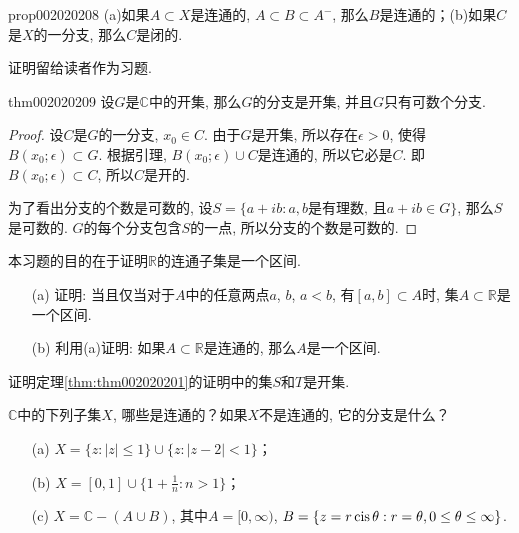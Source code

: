 \begin{proposition}{}{prop002020208}
(a)如果$A \subset X$是连通的, $A \subset B \subset A^-$, 那么$B$是连通的；(b)如果$C$是$X$的一分支, 那么$C$是闭的. 
\end{proposition}

证明留给读者作为习题. 

\begin{theorem}{}{thm002020209}
设$G$是$\mathbb{C}$中的开集, 那么$G$的分支是开集, 并且$G$只有可数个分支.  
\end{theorem}

\begin{proof}
设$C$是$G$的一分支, $x_0 \in C$. 由于$G$是开集, 所以存在$\epsilon > 0$, 使得$B(x_0;\epsilon) \subset G$. 根据引理, $B(x_0;\epsilon) \cup C$是连通的, 所以它必是$C$. 即$B(x_0;\epsilon) \subset C$, 所以$C$是开的. 

为了看出分支的个数是可数的, 设$S = \{a + ib: a, b\text{是有理数, 且}a+ib \in G\}$, 那么$S$是可数的. $G$的每个分支包含$S$的一点, 所以分支的个数是可数的. 
\end{proof}

\begin{exercise}\label{exer002020201}
本习题的目的在于证明$\mathbb{R}$的连通子集是一个区间. 
\begin{enumerate}
\item[(a)]证明: 当且仅当对于$A$中的任意两点$a$, $b$, $a < b$, 有$[a, b] \subset A$时, 集$A \subset \mathbb{R}$是一个区间. 
\item[(b)]利用(a)证明: 如果$A \subset \mathbb{R}$是连通的, 那么$A$是一个区间. 
\end{enumerate}
\end{exercise}

\begin{exercise}\label{exer002020202}
证明定理\ref{thm:thm002020201}的证明中的集$S$和$T$是开集. 
\end{exercise}

\begin{exercise}\label{exer002020203}
$\mathbb{C}$中的下列子集$X$, 哪些是连通的？如果$X$不是连通的, 它的分支是什么？
\begin{enumerate}
\item[(a)]$X = \{z: |z| \le 1\} \cup \{z:|z-2| < 1\}$；
\item[(b)]$X = [0, 1] \cup \{1 + \frac{1}{n}: n > 1\}$；
\item[(c)]$X = \mathbb{C} - (A \cup B)$, 其中$A = [0, \infty)$, $B = \{z = r\,\text{cis}\,{\theta} : r = \theta, 0 \le \theta \le \infty \}$. 
\end{enumerate}
\end{exercise}

